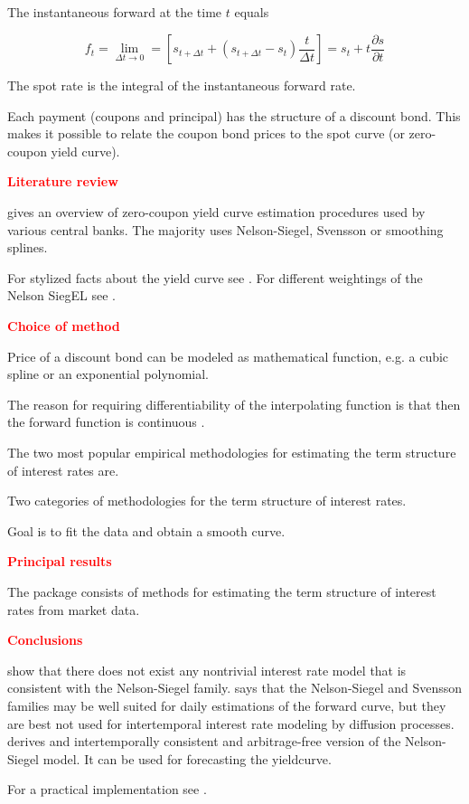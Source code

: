 The instantaneous forward at the time $t$ equals

\begin{equation}
  \label{instfwdrate}
  f_t=\lim_{\Delta t \rightarrow 0}=\left[s_{t+\Delta t}+(s_{t+\Delta t}-s_t)\frac{t}{\Delta t}\right]=s_t+t\frac{\partial s}{\partial t}
\end{equation}

The spot rate is the integral of the instantaneous forward rate.


Each payment (coupons and principal) has the structure of a discount bond. This makes it possible to relate the coupon bond prices to the spot curve (or zero-coupon yield curve).

\textcolor{red}{\textbf{Literature review}}

\cite{BIS2005, Bolder1999, Bliss1997, Soederlind1997, Ioannides2003, Diebold2006, Nawalkha2005}

\cite{BIS2005} gives an overview of zero-coupon yield curve estimation procedures used by various central banks. The majority uses Nelson-Siegel, Svensson or smoothing splines.

For stylized facts about the yield curve see \cite[p. 7]{Diebold2006}. For different weightings of the Nelson SiegEL see \cite{Soederlind1997, Bliss1997}.

\textcolor{red}{\textbf{Choice of method}}

\cite{Nelson1987, Svensson1994, McCulloch1975}

Price of a discount bond can be modeled as mathematical function, e.g. a cubic spline or an exponential polynomial.

The reason for requiring differentiability of the interpolating function is that then the forward function is continuous \citep[see][p. 97]{Hagan2006}.

The two most popular empirical methodologies for estimating the term structure of interest rates are.

Two categories of methodologies for the term structure of interest rates.

Goal is to fit the data and obtain a smooth curve.

\textcolor{red}{\textbf{Principal results}}

The  package  consists of methods for estimating the term structure of interest rates from market data.

\textcolor{red}{\textbf{Conclusions}}

\cite{Filipovic1999, Bjoerk1999} show that there does not exist any nontrivial interest rate model that is consistent with the Nelson-Siegel family. \cite{Filipovic2000} says that the Nelson-Siegel and Svensson families may be well suited for daily estimations of the forward curve, but they are best not used for intertemporal interest rate modeling by diffusion processes. \cite{Krippner2006} derives and intertemporally consistent and arbitrage-free version of the Nelson-Siegel model. It can be used for forecasting the yieldcurve.

For a practical implementation see \cite{Bolder2006}. 

